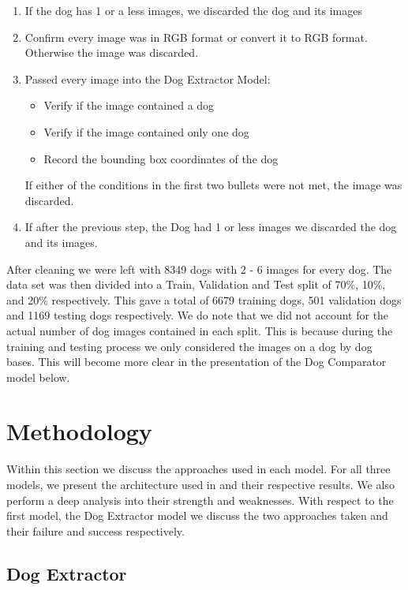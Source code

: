 \documentclass{article}
\begin{document}
\begin{enumerate}
  
  \item If the dog has 1 or a less images, we discarded the dog and its images
  
  \item Confirm every image was in RGB format or convert it to RGB format.  Otherwise the image was discarded.
  
  \item Passed every image into the Dog Extractor Model:
    \begin{itemize}
      \item Verify if the image contained a dog
      \item Verify if the image contained only one dog
      \item Record the bounding box coordinates of the dog
    \end{itemize}
    If either of the conditions in the first two bullets were not met, the image was discarded.
    
  \item If after the previous step, the Dog had 1 or less images we discarded the dog and its images.
  
\end{enumerate}

\noindent After cleaning we were left with 8349 dogs with 2 - 6 images for every dog.  The data set was then divided into a Train, Validation and Test split of 70\%, 10\%, and 20\% respectively.  This gave a total of 6679 training dogs, 501 validation dogs and 1169 testing dogs respectively.  We do note that we did not account for the actual number of dog images contained in each split.  This is because during the training and testing process we only considered the images on a dog by dog bases.  This will become more clear in the presentation of the Dog Comparator model below.

\section{Methodology}
Within this section we discuss the approaches used in each model.  For all three models, we present the architecture used in and their respective results.  We also perform a deep analysis into their strength and weaknesses.  With respect to the first model, the Dog Extractor model we discuss the two approaches taken and their failure and success respectively.

\subsection{Dog Extractor}
\end{document}
